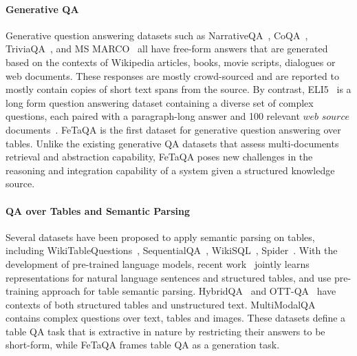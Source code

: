 \documentclass[11pt,a4paper]{article}
\newcommand{\ours}{FeTaQA\xspace}
\begin{document}
\paragraph{Generative QA} Generative question answering datasets such as NarrativeQA~\cite{kovcisky2018narrativeqa},
CoQA~\cite{reddy2019coqa}, 
TriviaQA~\cite{joshi2017triviaqa}, and MS MARCO~\cite{nguyen-etal-2016-msmarco} all have free-form answers that are generated based on the contexts of Wikipedia articles, books, movie scripts, dialogues or web documents. These responses are mostly crowd-sourced and are reported to mostly contain copies of short text spans from the source.
By contrast, ELI5~\cite{fan-etal-2019-ELI5} is a long form question answering dataset containing a diverse set of complex questions, each paired with a paragraph-long answer and 100 relevant $\textit{web source}$ documents~\cite{petroni2020kilt,krishna2021lfqa}. 
\ours is the first dataset for generative question answering over tables. Unlike the existing generative QA datasets that assess multi-documents retrieval and abstraction capability, \ours poses new challenges in the reasoning and integration capability of a system given a structured knowledge source. 



\paragraph{QA over Tables and Semantic Parsing} 
Several datasets have been proposed to apply semantic parsing on tables, including WikiTableQuestions~\cite{pasupat-liang-2015-compositional}, SequentialQA~\cite{iyyer-etal-2017-search}, WikiSQL~\cite{zhong2017seq2sql}, Spider~\cite{yu-etal-2018-spider}. With the development of pre-trained language models, recent work~\cite{yin-etal-2020-tabert,herzig-etal-2020-tapas,eisenschlos-etal-2020-understanding,iida2021tabbie} jointly learns representations for natural language sentences and structured tables, and \citet{yu2020grappa,yu2021score} use pre-training approach for table semantic parsing. HybridQA~\cite{chen2020hybridqa} and OTT-QA~\cite{Chen2020OpenQA} have contexts of both structured tables and unstructured text. MultiModalQA~\cite{talmor2021multimodalqa} contains complex questions over text, tables and images. These datasets define a table QA task that is extractive in nature by restricting their answers to be short-form, while \ours frames table QA as a generation task.
\end{document}
